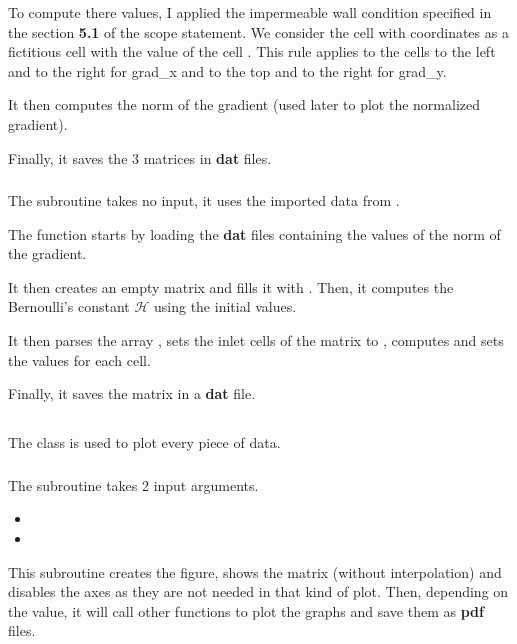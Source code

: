 To compute there values, I applied the impermeable wall condition specified in
the section \textbf{5.1} of the scope statement. We consider the 
 cell with coordinates \py{[i - 1, j]} as a fictitious cell with
the value of the cell \py{[i, j]}. This rule applies to the cells to the left
and to the right for grad\_x and to the top and to the right for grad\_y.

It then computes the norm of the gradient (used later to plot the normalized
gradient).

Finally, it saves the 3 matrices in \textbf{dat} files.

\subsubsection{\textcolor{func}{}}
The subroutine  takes no input, it uses the imported data
from .

The function starts by loading the \textbf{dat} files containing the values of
the norm of the gradient.

It then creates an empty matrix  and fills it with .
Then, it computes the Bernoulli's constant $\mathcal{H}$ using the initial
values.

It then parses the array , sets the inlet cells of the
 matrix to , computes and sets the values for
each cell.

Finally, it saves the matrix in a \textbf{dat} file.

\subsection{}
The class is used to plot every piece of data.

\subsubsection{\textcolor{func}{}}
The subroutine  takes 2 input arguments.
\begin{itemize}
      \item {}
      \item {}
\end{itemize}
This subroutine creates the figure, shows the matrix  (without
interpolation) and disables the axes as they are not needed in that kind of
plot. Then, depending on the  value, it will call other 
functions to plot the graphs and save them as \textbf{pdf} files.

